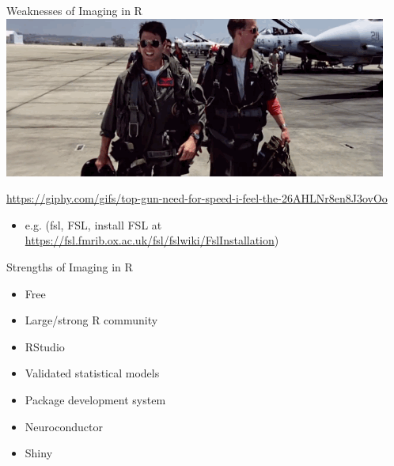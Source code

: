 \documentclass[ignorenonframetext,]{beamer}
\providecommand{\tightlist}{%
  \setlength{\itemsep}{0pt}\setlength{\parskip}{0pt}}
\begin{document}
\begin{frame}[fragile]
\begin{block}{Weaknesses of Imaging in R}
\hypertarget{right_col}{}
\includegraphics[width=1\linewidth]{figure/need_for_speed}

\url{https://giphy.com/gifs/top-gun-need-for-speed-i-feel-the-26AHLNr8en8J3ovOo}

\begin{itemize}
\tightlist
\item
  e.g. (fsl, FSL, install FSL at
  \url{https://fsl.fmrib.ox.ac.uk/fsl/fslwiki/FslInstallation})
\end{itemize}

\end{block}

\begin{block}{Strengths of Imaging in R}

\hypertarget{left_col}{}
\begin{itemize}
\tightlist
\item
  Free
\item
  Large/strong R community
\item
  RStudio
\item
  Validated statistical models
\item
  Package development system
\item
  Neuroconductor
\item
  Shiny
\end{itemize}


\end{block}
\end{frame}
\end{document}
